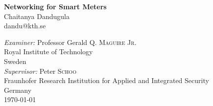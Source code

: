 \documentclass[a4paper,12pt, oneside, openright, draft]{report}
\begin{document}
\begin{titlepage}
\newcommand{\HRule}{\rule{\linewidth}{0.5mm}}
\begin{center}


{ \huge \bfseries Networking for Smart Meters}\\[0.4cm]
{\large Chaitanya Dandugula}\\
{\small dandu@kth.se}

\vfill

\emph{Examiner:} Professor Gerald \textsc{Q. Maguire Jr.}\\
{Royal Institute of Technology}\\
{Sweden}\\[0.8cm]

\emph{Supervisor:} Peter \textsc{Schoo}\\
{Fraunhofer Research Institution for Applied and Integrated Security}\\
{Germany}\\[0.8cm]

{\small \today}

\end{center}

\end{titlepage}

\begin{abstract}

\indent This literature study report is part of the Master's thesis project - ``Networking for Smart Meters''. The report starts by giving a broad overview of the problem that is to be solved and then moves on to different technologies, specifically PLC, 6LoWPAN, and HIP, that can be used to develop the network architecture. Methods for securing the network include the Resurrecting Duckling Policy and the BSI Protection Profile. These methods are discussed before concluding the report with a summary of the previous work done in this field. 

The result of this literature study will be the base for further work and implementation of a proof-of-concept based on the chosen network architecture. 

\end{abstract}

\tableofcontents
\listoffigures
\listoftables
\renewcommand{\nomname}{List of Abbreviations}
\printnomenclature[2.5cm]











\end{document}
